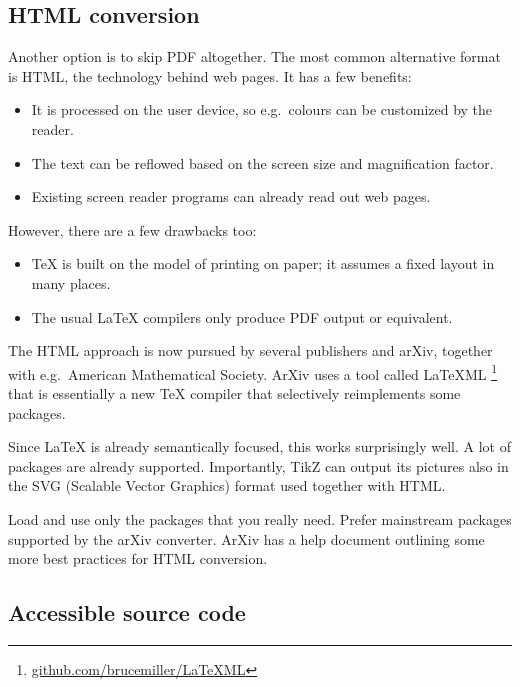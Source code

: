 %
%
\subsection{HTML conversion}

Another option is to skip PDF altogether.
The most common alternative format is HTML, the technology behind web pages.
It has a few benefits:
%
\begin{itemize}
\item It is processed on the user device, so e.g.\ colours can be customized by the reader.
\item The text can be reflowed based on the screen size and magnification factor.
\item Existing screen reader programs can already read out web pages.
\end{itemize}
%
However, there are a few drawbacks too:
%
\begin{itemize}
\item \TeX{} is built on the model of printing on paper; it assumes a fixed layout in many places.
\item The usual \LaTeX{} compilers only produce PDF output or equivalent.
\end{itemize}

The HTML approach is now pursued by several publishers and arXiv,
together with e.g.\ American Mathematical Society.
ArXiv uses a tool called \mbox{LaTeXML}%
\footnote{\url{github.com/brucemiller/LaTeXML}}
that is essentially a new \TeX{} compiler that selectively reimplements some packages.

Since \LaTeX{} is already semantically focused, this works surprisingly well.
A lot of packages are already supported.
Importantly, TikZ can output its pictures also in the SVG (Scalable Vector Graphics) format
used together with HTML.

\begin{practices}
Load and use only the packages that you really need.
Prefer mainstream packages supported by the arXiv converter.
ArXiv has a help document outlining some more best practices for HTML conversion.\footnotemark
\end{practices}



%
%
\subsection{Accessible source code}

